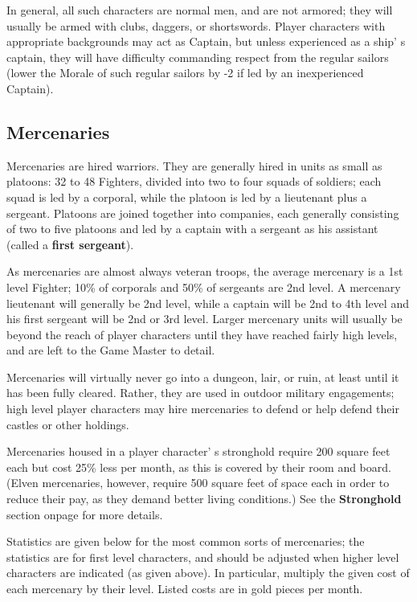 \documentclass[a4paper,twoside,openany,10pt]{book}
\begin{document}
\begin{multicols}{2}
In general, all such characters are normal men, and are not armored; they will usually be armed with clubs, daggers, or shortswords. Player characters with appropriate backgrounds may act as Captain, but unless experienced as a ship' s captain, they will have difficulty commanding respect from the regular sailors (lower the Morale of such regular sailors by -2 if led by an inexperienced Captain).

\subsection{Mercenaries}\label{mercenaries}

Mercenaries are hired warriors. They are generally hired in units as small as platoons: 32 to 48 Fighters, divided into two to four squads of soldiers; each squad is led by a corporal, while the platoon is led by a lieutenant plus a sergeant. Platoons are joined together into companies, each generally consisting of two to five platoons and led by a captain with a sergeant as his assistant (called a \textbf{first sergeant}).

As mercenaries are almost always veteran troops, the average mercenary is a 1st level Fighter; 10\% of corporals and 50\% of sergeants are 2nd level. A mercenary lieutenant will generally be 2nd level, while a captain will be 2nd to 4th level and his first sergeant will be 2nd or 3rd level. Larger mercenary units will usually be beyond the reach of player characters until they have reached fairly high levels, and are left to the Game Master to detail.

Mercenaries will virtually never go into a dungeon, lair, or ruin, at least until it has been fully cleared. Rather, they are used in outdoor military engagements; high level player characters may hire mercenaries to defend or help defend their castles or other holdings.

Mercenaries housed in a player character' s stronghold require 200 square feet each but cost 25\% less per month, as this is covered by their room and board. (Elven mercenaries, however, require 500 square feet of space each in order to reduce their pay, as they demand better living conditions.) See the \textbf{Stronghold} section onpage \hyperlink{strongholds}{\pageref{strongholds}} for more details.

Statistics are given below for the most common sorts of mercenaries; the statistics are for first level characters, and should be adjusted when higher level characters are indicated (as given above). In particular, multiply the given cost of each mercenary by their level. Listed costs are in gold pieces per month.

\end{multicols}
\end{document}

